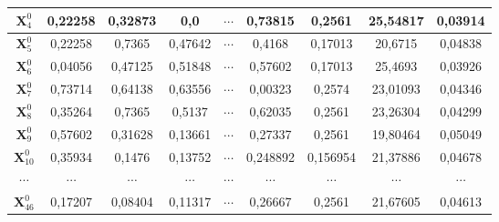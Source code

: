{{\begin{enumerate}[align = left, left = 0cm, nolistsep]
{\begin{tabularx}{\textwidth}{|c|cccccc|c|c|}
                  $\boldsymbol{X}_{4}^{0}$  & \multicolumn{1}{c|}{0,22258}                    & \multicolumn{1}{c|}{0,32873}  & \multicolumn{1}{c|}{0,0}      & \multicolumn{1}{c|}{$\cdots$} & \multicolumn{1}{c|}{0,73815}  & 0,2561   & 25,54817 & 0,03914  \\ \hline
                  $\boldsymbol{X}_{5}^{0}$  & \multicolumn{1}{c|}{0,22258}                    & \multicolumn{1}{c|}{0,7365}   & \multicolumn{1}{c|}{0,47642}  & \multicolumn{1}{c|}{$\cdots$} & \multicolumn{1}{c|}{0,4168}   & 0,17013  & 20,6715  & 0,04838  \\ \hline
                  $\boldsymbol{X}_{6}^{0}$  & \multicolumn{1}{c|}{0,04056}                    & \multicolumn{1}{c|}{0,47125}  & \multicolumn{1}{c|}{0,51848}  & \multicolumn{1}{c|}{$\cdots$} & \multicolumn{1}{c|}{0,57602}  & 0,17013  & 25,4693  & 0,03926  \\ \hline
                  $\boldsymbol{X}_{7}^{0}$  & \multicolumn{1}{c|}{0,73714}                    & \multicolumn{1}{c|}{0,64138}  & \multicolumn{1}{c|}{0,63556}  & \multicolumn{1}{c|}{$\cdots$} & \multicolumn{1}{c|}{0,00323}  & 0,2574   & 23,01093 & 0,04346  \\ \hline
                  $\boldsymbol{X}_{8}^{0}$  & \multicolumn{1}{c|}{0,35264}                    & \multicolumn{1}{c|}{0,7365}   & \multicolumn{1}{c|}{0,5137}   & \multicolumn{1}{c|}{$\cdots$} & \multicolumn{1}{c|}{0,62035}  & 0,2561   & 23,26304 & 0,04299  \\ \hline
                  $\boldsymbol{X}_{9}^{0}$  & \multicolumn{1}{c|}{0,57602}                    & \multicolumn{1}{c|}{0,31628}  & \multicolumn{1}{c|}{0,13661}  & \multicolumn{1}{c|}{$\cdots$} & \multicolumn{1}{c|}{0,27337}  & 0,2561   & 19,80464 & 0,05049  \\ \hline
                  $\boldsymbol{X}_{10}^{0}$ & \multicolumn{1}{c|}{0,35934}                    & \multicolumn{1}{c|}{0,1476}   & \multicolumn{1}{c|}{0,13752}  & \multicolumn{1}{c|}{$\cdots$} & \multicolumn{1}{c|}{0,248892} & 0,156954 & 21,37886 & 0,04678  \\ \hline
                  $\cdots$     & \multicolumn{1}{c|}{$\cdots$}                   & \multicolumn{1}{c|}{$\cdots$} & \multicolumn{1}{c|}{$\cdots$} & \multicolumn{1}{c|}{$\cdots$} & \multicolumn{1}{c|}{$\cdots$} & $\cdots$ & $\cdots$ & $\cdots$ \\ \hline
                  $\boldsymbol{X}_{46}^{0}$ & \multicolumn{1}{c|}{0,17207}                    & \multicolumn{1}{c|}{0,08404}  & \multicolumn{1}{c|}{0,11317}  & \multicolumn{1}{c|}{$\cdots$} & \multicolumn{1}{c|}{0,26667}  & 0,2561   & 21,67605 & 0,04613  \\ \hline

\end{tabularx}}
\end{enumerate}}}
